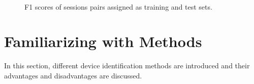 \documentclass[journal]{IEEEtran}
\begin{document}
\begin{figure}[ht]
	
\\
%

	
	\caption{F1 scores of sessions pairs  assigned as training and test sets.}
	\label{fig:stepsofID}
\end{figure}




\section{Familiarizing with Methods}\label{section:Methods}

In this section, different device identification methods are introduced and their advantages and disadvantages are discussed.

\end{document}
